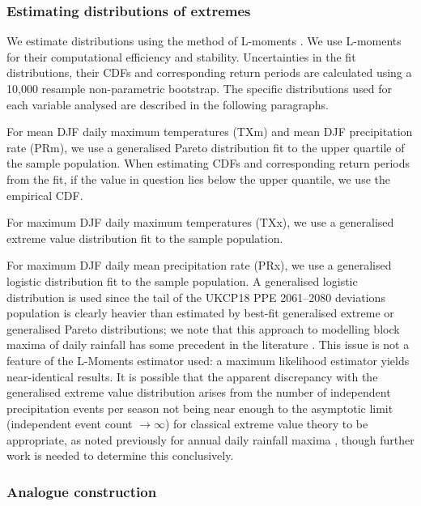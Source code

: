     \subsubsection{Estimating distributions of extremes}

      We estimate distributions using the method of L-moments \citep{hosking_estimation_1985,hosking_l-moments_1990,hosking_regional_1997}. We use L-moments for their computational efficiency and stability. Uncertainties in the fit distributions, their CDFs and corresponding return periods are calculated using a 10,000 resample non-parametric bootstrap. The specific distributions used for each variable analysed are described in the following paragraphs.
      
      For mean DJF daily maximum temperatures (TXm) and mean DJF precipitation rate (PRm), we use a generalised Pareto distribution \citep{coles_introduction_2001,hosking_parameter_1987} fit to the upper quartile of the sample population. When estimating CDFs and corresponding return periods from the fit, if the value in question lies below the upper quantile, we use the empirical CDF.

      For maximum DJF daily maximum temperatures (TXx), we use a generalised extreme value distribution fit to the sample population.

      For maximum DJF daily mean precipitation rate (PRx), we use a generalised logistic distribution \citep{hosking_l-moments_1990} fit to the sample population. A generalised logistic distribution is used since the tail of the UKCP18 PPE 2061--2080 deviations population is clearly heavier than estimated by best-fit generalised extreme or generalised Pareto distributions; we note that this approach to modelling block maxima of daily rainfall has some precedent in the literature \citep{kysely_probability_2007,wan_zin_best_2009}. This issue is not a feature of the L-Moments estimator used: a maximum likelihood estimator yields near-identical results. It is possible that the apparent discrepancy with the generalised extreme value distribution arises from the number of independent precipitation events per season not being near enough to the asymptotic limit (independent event count $\rightarrow \infty$) for classical extreme value theory to be appropriate, as noted previously for annual daily rainfall maxima \citep{marani_metastatistical_2015}, though further work is needed to determine this conclusively.

    \subsubsection{Analogue construction}

